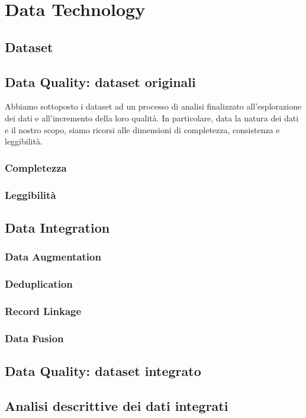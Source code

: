\setcounter{chapter}{0}

\part{Data Technology}

\chapter{Dataset}

\chapter{Data Quality: dataset originali}
\label{chap:data-quality}
Abbiamo sottoposto i dataset ad un processo di analisi finalizzato 
all'esplorazione dei dati e all'incremento della loro qualità. In particolare, 
data la natura dei dati e il nostro scopo, siamo ricorsi alle dimensioni di 
completezza, consistenza e leggibilità.


\section{Completezza}

\section{Leggibilità}

\chapter{Data Integration}
\label{chap:data-integration}

\section{Data Augmentation}

\section{Deduplication}

\section{Record Linkage}
\label{sec:record-linkage}

\section{Data Fusion}
\label{sec:data-fusion}

\chapter{Data Quality: dataset integrato}

\chapter{Analisi descrittive dei dati integrati}
